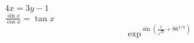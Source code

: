 \documentclass[10pt,a4paper]{article}
\begin{document}
$4x = 3y - 1$ \\
$\frac{\sin x}{\cos x} = \tan x$
\begin{equation}
	\exp^{\sin(\frac{1}{\sqrt{3}} + 86^{1/n})}
\end{equation}
\end{document}
